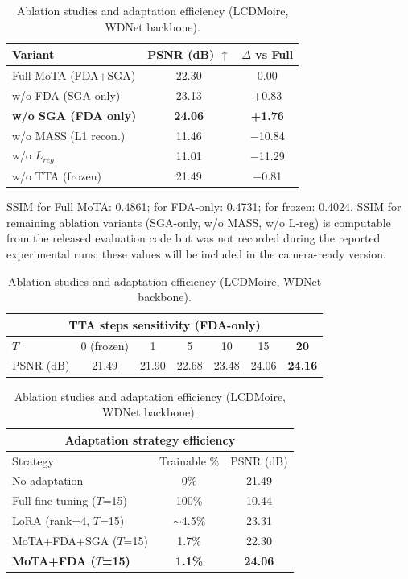 \documentclass[review,10pt]{elsarticle}
\begin{document}
\begin{table}[tb]
\centering
\footnotesize
\caption{Ablation studies and adaptation efficiency (LCDMoire, WDNet backbone).}
\label{tab:ablation}
\setlength{\tabcolsep}{3.5pt}
\begin{tabular}{@{}lcc@{}}
\toprule
Variant & PSNR (dB) $\uparrow$ & $\Delta$ vs Full \\
\midrule
Full MoTA (FDA+SGA) & 22.30 & 0.00 \\
w/o FDA (SGA only) & 23.13 & +0.83 \\
\textbf{w/o SGA (FDA only)} & \textbf{24.06} & \textbf{+1.76} \\
w/o MASS (L1 recon.) & 11.46 & $-$10.84 \\
w/o $L_{reg}$ & 11.01 & $-$11.29 \\
w/o TTA (frozen) & 21.49 & $-$0.81 \\
\bottomrule
\end{tabular}
\vspace{0.3em}

{\footnotesize SSIM for Full MoTA: 0.4861; for FDA-only: 0.4731; for frozen: 0.4024. SSIM for remaining ablation variants (SGA-only, w/o MASS, w/o L-reg) is computable from the released evaluation code but was not recorded during the reported experimental runs; these values will be included in the camera-ready version.}

\vspace{0.3em}

\begin{tabular}{@{}lcccccc@{}}
\toprule
\multicolumn{7}{c}{TTA steps sensitivity (FDA-only)} \\
\midrule
$T$ & 0 (frozen) & 1 & 5 & 10 & 15 & \textbf{20} \\
\midrule
PSNR (dB) & 21.49 & 21.90 & 22.68 & 23.48 & 24.06 & \textbf{24.16} \\
\bottomrule
\end{tabular}

\vspace{0.3em}

\begin{tabular}{@{}lcc@{}}
\toprule
\multicolumn{3}{c}{Adaptation strategy efficiency} \\
\midrule
Strategy & Trainable \% & PSNR (dB) \\
\midrule
No adaptation & 0\% & 21.49 \\
Full fine-tuning ($T$=15) & 100\% & 10.44 \\
LoRA (rank=4, $T$=15) & $\sim$4.5\% & 23.31 \\
MoTA+FDA+SGA ($T$=15) & 1.7\% & 22.30 \\
\textbf{MoTA+FDA ($T$=15)} & \textbf{1.1\%} & \textbf{24.06} \\
\bottomrule
\end{tabular}
\end{table}
\end{document}
